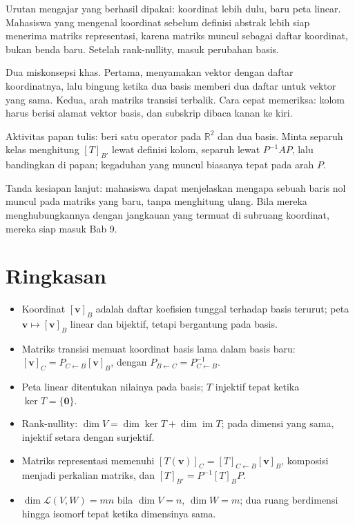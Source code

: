 \begin{untukdosen}
Urutan mengajar yang berhasil dipakai: koordinat lebih dulu, baru peta linear. Mahasiswa
yang
mengenal koordinat sebelum definisi abstrak lebih siap menerima matriks representasi, karena
matriks muncul sebagai daftar koordinat, bukan benda baru. Setelah rank-nullity, masuk
perubahan basis.

Dua miskonsepsi khas. Pertama, menyamakan vektor dengan daftar koordinatnya, lalu bingung
ketika dua basis memberi dua daftar untuk vektor yang sama. Kedua, arah matriks transisi
terbalik. Cara cepat memeriksa: kolom harus berisi alamat vektor basis, dan subskrip dibaca
kanan ke kiri.

Aktivitas papan tulis: beri satu operator pada $\mathbb{R}^{2}$ dan dua basis. Minta separuh
kelas menghitung $[T]_{B'}$ lewat definisi kolom, separuh lewat $P^{-1}AP$, lalu bandingkan
di
papan; kegaduhan yang muncul biasanya tepat pada arah $P$.

Tanda kesiapan lanjut: mahasiswa dapat menjelaskan mengapa sebuah baris nol muncul pada
matriks yang baru, tanpa menghitung ulang. Bila mereka menghubungkannya dengan jangkauan
yang
termuat di subruang koordinat, mereka siap masuk Bab 9.
\end{untukdosen}

\section{Ringkasan}

\begin{ringkasan}
\begin{itemize}
  \item Koordinat $[\mathbf{v}]_{B}$ adalah daftar koefisien tunggal terhadap basis terurut;
        peta $\mathbf{v}\mapsto[\mathbf{v}]_{B}$ linear dan bijektif, tetapi bergantung pada
        basis.
  \item Matriks transisi memuat koordinat basis lama dalam basis baru:
        $[\mathbf{v}]_{C}=P_{C\leftarrow B}[\mathbf{v}]_{B}$, dengan
        $P_{B\leftarrow C}=P_{C\leftarrow B}^{-1}$.
  \item Peta linear ditentukan nilainya pada basis; $T$ injektif tepat ketika
        $\ker T=\{\mathbf{0}\}$.
  \item Rank-nullity: $\dim V=\dim\ker T+\dim\operatorname{im}T$; pada dimensi yang sama,
        injektif setara dengan surjektif.
  \item Matriks representasi memenuhi
$[T(\mathbf{v})]_{C}=[T]_{C\leftarrow B}[\mathbf{v}]_{B}$, komposisi menjadi perkalian
        matriks, dan $[T]_{B'}=P^{-1}[T]_{B}P$.
  \item $\dim\mathcal{L}(V,W)=mn$ bila $\dim V=n$, $\dim W=m$; dua ruang berdimensi hingga
        isomorf tepat ketika dimensinya sama.
\end{itemize}
\end{ringkasan}

